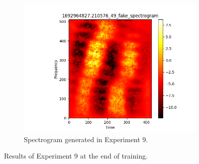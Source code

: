 \begin{figure}[!ht]
\begin{subfigure}{0.3\textwidth}
        \includegraphics[width=\textwidth]{figures/4.5-results/exp9_spectrogram.png}
        \caption{Spectrogram generated in Experiment 9.}
        \label{fig:exp9_spectrogram}
    \end{subfigure}
    \caption{Results of Experiment 9 at the end of training.}
    \label{fig:exp9_results}
\end{figure}